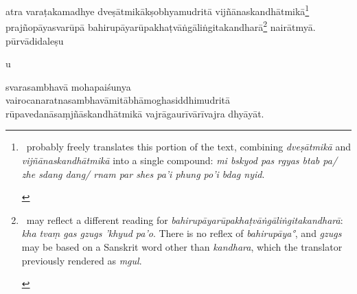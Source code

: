 \documentclass[naipra.tex]{subfiles}
\begin{document}
\begin{sanskrit}



\pstart
atra varaṭakamadhye   dveṣātmikākṣobhyamudritā vijñānaskandhātmikā\footnote{
	\begin{english}%
		\TIB\ probably freely translates this portion of the text, combining \emph{dveṣātmikā} and \emph{vijñānaskandhātmikā} into a single compound: \emph{mi bskyod pas rgyas btab pa/ zhe sdang dang/ rnam par shes pa'i phung po'i bdag nyid}. 
	\end{english}
} prajñopāyasvarūpā bahirupāyarūpakhaṭvāṅgāliṅgitakandharā\footnote{
	\begin{english}%
		\TIB\ may reflect a different reading for \emph{bahirupāyarūpakhaṭvāṅgāliṅgitakandharā}: \emph{kha tvaṃ gas gzugs 'khyud pa'o}.
		There is no reflex of \emph{bahirupāya°}, and \emph{gzugs} may be based on a Sanskrit word other than \emph{kandhara}, which the translator previously rendered as \emph{mgul}.
	\end{english}
} nairātmyā.
pūrvādidaleṣu \begin{mantra}\dsh u\end{mantra}\dsh svarasambhavā mohapaiśunya vairocanaratnasambhavāmitābhāmoghasiddhimudritā rūpavedanāsaṃjñāskandhātmikā vajrāgaurīvārīvajra dhyāyāt. 
\pend


\end{sanskrit}
\end{document}
